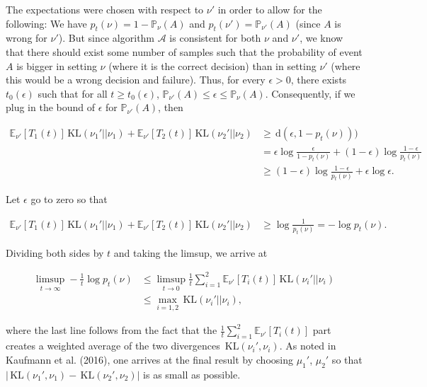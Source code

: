 \documentclass[11pt,]{article}
\newcommand{\KL}{\,\text{KL}}
\newcommand{\der}{\,\text{d}}
\begin{document}
The expectations were chosen with respect to \(\nu'\) in order to allow
for the following: We have \(p_t(\nu) = 1 - \mathbb{P}_{\nu}(A)\) and
\(p_t(\nu') = \mathbb{P}_{\nu'}(A)\) (since \(A\) is wrong for
\(\nu'\)). But since algorithm \(\mathcal{A}\) is consistent for both
\(\nu\) and \(\nu'\), we know that there should exist some number of
samples such that the probability of event \(A\) is bigger in setting
\(\nu\) (where it is the correct decision) than in setting \(\nu'\)
(where this would be a wrong decision and failure). Thus, for every
\(\epsilon > 0\), there exists \(t_0(\epsilon)\) such that for all
\(t \geq t_0(\epsilon)\),
\(\mathbb{P}_{\nu'}(A) \leq \epsilon \leq \mathbb{P}_\nu(A)\).
Consequently, if we plug in the bound of \(\epsilon\) for
\(\mathbb{P}_{\nu'}(A)\), then

\begin{align*}
\mathbb{E}_{\nu'}[T_1(t)]\KL(\nu_1' || \nu_1) + \mathbb{E}_{\nu'}[T_2(t)]\KL(\nu_2' || \nu_2) & \geq \der(\epsilon,1-p_t(\nu))) \\
& = \epsilon \log \frac{\epsilon}{1-p_t(\nu)} + (1-\epsilon) \log \frac{1-\epsilon}{p_t(\nu)} \\
& \geq (1-\epsilon) \log \frac{1-\epsilon}{p_t(\nu)} + \epsilon \log \epsilon.
\end{align*}

Let \(\epsilon\) go to zero so that

\begin{align*}
\mathbb{E}_{\nu'}[T_1(t)]\KL(\nu_1' || \nu_1) + \mathbb{E}_{\nu'}[T_2(t)]\KL(\nu_2' || \nu_2)
& \geq \log \frac{1}{p_t(\nu)} = -\log p_t(\nu).
\end{align*}

Dividing both sides by \(t\) and taking the limsup, we arrive at

\begin{align*}
\limsup_{t \to \infty} - \frac{1}{t} \log p_t(\nu)
& \leq \limsup_{t \to 0} \frac{1}{t} \sum_{i=1}^2 \mathbb{E}_{\nu'}[T_i(t)] \KL(\nu_i' || \nu_i) \\
& \leq \max_{i=1,2} \KL(\nu_i' || \nu_i),
\end{align*}

where the last line follows from the fact that the
\(\frac{1}{t} \sum_{i=1}^2 \mathbb{E}_{\nu'}[T_i(t)]\) part creates a
weighted average of the two divergences \(\KL(\nu_i', \nu_i)\). As noted
in Kaufmann et al. (2016), one arrives at the final result by choosing
\(\mu_1'\), \(\mu_2'\) so that
\(| \KL(\nu_1', \nu_1) - \KL(\nu_2', \nu_2) |\) is as small as possible.
\end{document}
